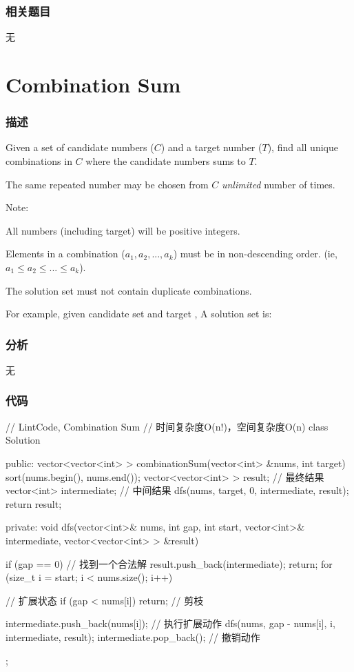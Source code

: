 \subsubsection{相关题目}
\begindot
\item 无
\myenddot


\section{Combination Sum} %
\label{sec:combination-sum}


\subsubsection{描述}
Given a set of candidate numbers ($C$) and a target number ($T$), find all unique combinations in $C$ where the candidate numbers sums to $T$.

The same repeated number may be chosen from $C$ \emph{unlimited} number of times.

Note:
\begindot
\item All numbers (including target) will be positive integers.
\item Elements in a combination ($a_1, a_2, ..., a_k$) must be in non-descending order. (ie, $a_1 \leq a_2 \leq ... \leq a_k$).
\item The solution set must not contain duplicate combinations.
\myenddot

For example, given candidate set  and target , 
A solution set is: 
\begin{Code}
[7] 
[2, 2, 3] 
\end{Code}


\subsubsection{分析}
无


\subsubsection{代码}
\begin{Code}
// LintCode, Combination Sum
// 时间复杂度O(n!)，空间复杂度O(n)
class Solution {
public:
    vector<vector<int> > combinationSum(vector<int> &nums, int target) {
        sort(nums.begin(), nums.end());
        vector<vector<int> > result; // 最终结果
        vector<int> intermediate; // 中间结果
        dfs(nums, target, 0, intermediate, result);
        return result;
    }

private:
    void dfs(vector<int>& nums, int gap, int start, vector<int>& intermediate,
            vector<vector<int> > &result) {
        if (gap == 0) {  // 找到一个合法解
            result.push_back(intermediate);
            return;
        }
        for (size_t i = start; i < nums.size(); i++) { // 扩展状态
            if (gap < nums[i]) return; // 剪枝

            intermediate.push_back(nums[i]); // 执行扩展动作
            dfs(nums, gap - nums[i], i, intermediate, result);
            intermediate.pop_back();  // 撤销动作
        }
    }
};
\end{Code}


